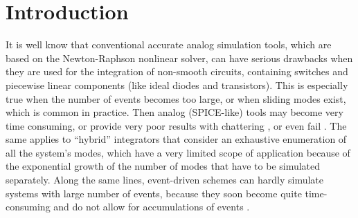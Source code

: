 

\section{Introduction}



It is well know that conventional accurate analog simulation tools, which are based on the Newton-Raphson nonlinear solver, can have serious drawbacks when they are used for the integration of non-smooth circuits, containing switches and piecewise linear components (like ideal diodes and transistors). This is especially true when the number of events becomes too large, or when sliding modes exist, which is common in practice. Then analog (SPICE-like) tools  may become very time consuming, or provide very poor results with chattering \cite{galias2006}, or even fail \cite{maffezzoni2006,yuan2003,mayaram2000,chung1994,biolek2007}. The same applies to ``hybrid'' integrators that consider an exhaustive enumeration of all the system's modes, which have a very limited scope of application because of the exponential growth of the number of modes that have to be simulated separately. Along the same lines, event-driven schemes can hardly simulate systems with large number of events, because they soon become quite time-consuming and do not allow for accumulations of events \cite{acary-brogliato2008}. 

